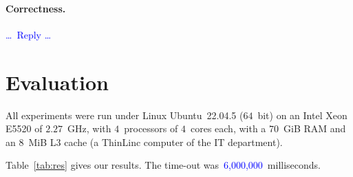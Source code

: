 \documentclass[a4paper,11pt,hidelinks]{article}
\renewcommand{\todo}[1]{\textcolor{blue}{#1}} %
\begin{document}
\paragraph{Correctness.}
\todo{\dots\ Reply \dots}


\section{Evaluation}


All experiments were run under Linux Ubuntu~22.04.5 ($64$~bit) on an
Intel Xeon E5520 of $2.27$~GHz, with $4$~processors of $4$~cores each,
with a $70$~GiB RAM and an $8$~MiB L3 cache (a ThinLinc computer of the
IT department). %

\newcommand{\TimeOut}{\todo{6,000,000}} %


Table~\ref{tab:res} gives our results.
The time-out was~\TimeOut~milliseconds.
\end{document}
